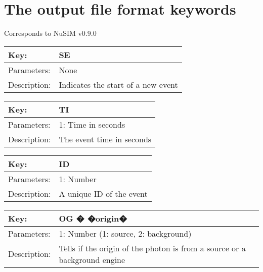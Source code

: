 \chapter{The output file format keywords}
Corresponds to NuSIM v0.9.0

\begin{table}[htdp]
\begin{center}
\begin{tabular}{|p{2cm}|p{12cm}|}
\hline
Key: &	SE\\
\hline
Parameters:	& None\\
\hline
Description:	& Indicates the start of a new event\\
\hline
\end{tabular}
\end{center}
\label{default}
\end{table}

\begin{table}[htdp]
\begin{center}
\begin{tabular}{|p{2cm}|p{12cm}|}
\hline
Key:	&TI\\
\hline
Parameters:&	1: Time in seconds\\
\hline
Description:&	The event time in seconds\\
\hline
\end{tabular}
\end{center}
\end{table}

\begin{table}[htdp]
\begin{center}
\begin{tabular}{|p{2cm}|p{12cm}|}
\hline
Key:	&ID\\
\hline
Parameters:&	1: Number\\
\hline
Description:&	A unique ID of the event\\
\hline
\end{tabular}
\end{center}
\end{table}

\begin{table}[htdp]
\begin{center}
\begin{tabular}{|p{2cm}|p{12cm}|}
\hline
Key:	&OG � �origin�\\
\hline
Parameters:&	1: Number (1: source, 2: background)\\
\hline
Description:&	Tells if the origin of the photon is from a source or a background engine\\
\hline
\end{tabular}
\end{center}
\end{table}

